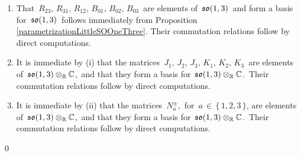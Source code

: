 \proof
\begin{enumerate}
\item
	That
	\,$R_{23},\, R_{31},\, R_{12},\, B_{01},\, B_{02},\, B_{03}$\,
	are elements of
	\,$\mathfrak{so}(1,3)$\,
	and form a basis for
	\,$\mathfrak{so}(1,3)$\,
	follows immediately from Proposition \ref{parametrizationLittleSOOneThree}.
	Their commutation relations follow by direct computations.
\item
	It is immediate by (i) that the matrices
	\,$J_{1},\, J_{2},\, J_{3},\, K_{1},\, K_{2},\, K_{3}$\,
	are elements of
	\,$\mathfrak{so}(1,3) \otimes_{\mathbb{R}} \mathbb{C}$,\,
	and that they form a basis for
	\,$\mathfrak{so}(1,3) \otimes_{\mathbb{R}} \mathbb{C}$.\,
	Their commutation relations follow by direct computations.
\item
	It is immediate by (ii) that the matrices
	\,$N^{\pm}_{a}$,\, for \,$a \,\in\, \{\,1,2,3\,\}$,
	are elements of
	\,$\mathfrak{so}(1,3) \otimes_{\mathbb{R}} \mathbb{C}$,\,
	and that they form a basis for
	\,$\mathfrak{so}(1,3) \otimes_{\mathbb{R}} \mathbb{C}$.\,
	Their commutation relations follow by direct computations.
\end{enumerate}
\qed



